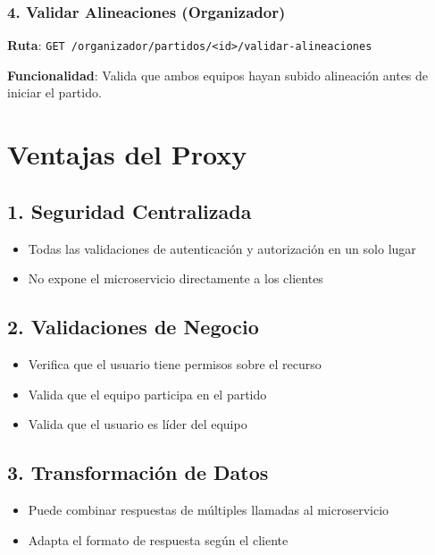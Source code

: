 \documentclass[
  spanish,
  11pt,
  letterpaper,
]{book}
\providecommand{\tightlist}{%
  \setlength{\itemsep}{0pt}\setlength{\parskip}{0pt}}
\begin{document}
\subsubsection{4. Validar Alineaciones
(Organizador)}\label{validar-alineaciones-organizador}

\textbf{Ruta}:
\texttt{GET\ /organizador/partidos/\textless{}id\textgreater{}/validar-alineaciones}

\textbf{Funcionalidad}: Valida que ambos equipos hayan subido alineación
antes de iniciar el partido.

\section{Ventajas del Proxy}\label{ventajas-del-proxy}

\subsection{1. Seguridad Centralizada}\label{seguridad-centralizada}

\begin{itemize}
\tightlist
\item
  Todas las validaciones de autenticación y autorización en un solo
  lugar
\item
  No expone el microservicio directamente a los clientes
\end{itemize}

\subsection{2. Validaciones de Negocio}\label{validaciones-de-negocio}

\begin{itemize}
\tightlist
\item
  Verifica que el usuario tiene permisos sobre el recurso
\item
  Valida que el equipo participa en el partido
\item
  Valida que el usuario es líder del equipo
\end{itemize}

\subsection{3. Transformación de
Datos}\label{transformaciuxf3n-de-datos}

\begin{itemize}
\tightlist
\item
  Puede combinar respuestas de múltiples llamadas al microservicio
\item
  Adapta el formato de respuesta según el cliente
\end{itemize}
\end{document}
